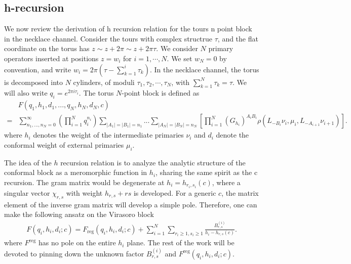\documentclass[12pt]{article}
\newcommand{\ie}{\begin{equation}\begin{aligned}}
\newcommand{\fe}{\end{aligned}\end{equation}}
\numberwithin{equation}{section}
\begin{document}
\subsection{h-recursion}

We now review the derivation of h recursion relation for the  tours n point block in the necklace channel.
Consider the tours with complex structrue $\tau$, and the flat coordinate on the torus has $z\sim z+2\pi\sim z+2\pi \tau$. We consider $N$ primary operators inserted at positions $z=w_i$ for $i=1,\cdots,N$. We set $w_N=0$ by convention, and write $w_i=2\pi(\tau-\sum_{k=1}^i\tau_k)$. In the necklace channel, the torus is decomposed into $N$ cylinders, of moduli $\tau_1, \tau_2, \cdots,\tau_N$, with $\sum_{k=1}^N\tau_k=\tau$. We will also write $q_i=e^{2\pi i\tau_i}$.  The torus $N$-point block is defined as
\ie\label{necklaceblock}
&F\left(q_1,h_1,d_1,...,q_N,h_N,d_N,c\right)
\\
=&\sum_{n_1,...,n_N=0}^{\infty}\left(\prod_{i=1}^{N}q_i^{n_i}\right)\sum_{|A_1|=|B_1|=n_1}...\sum_{|A_N|=|B_N|=n_N}\left[\prod_{i=1}^N\left(G_{h_i}\right)^{A_iB_i}\rho(L_{-B_i}\nu_i,\mu_i,L_{-A_{i+1}}\nu_{i+1})\right].
\fe
where $h_i$ denotes the weight of the intermediate primaries $\nu_i$ and $d_i$ denote the conformal weight of external primaries $\mu_i$.

The idea of the $h$ recursion relation is to analyze the analytic structure of the conformal block as a meromorphic function in $h_i$, sharing the same spirit as the c recursion. The gram matrix would be degenerate at $h_i=h_{r_i,s_i}(c)$, where a singular vector $\chi_{r,s}$ with weight $h_{r,s}+rs$ is developed. For a generic $c$, the matrix element of the inverse gram matrix will develop a simple pole. Therefore, one can make the following ansatz on the Virasoro block
\ie
F(q_i,h_i,d_i;c)= F_{\text{reg}}(q_i,h_i,d_i;c)+ \sum_{i=1}^N \sum_{r_i\geq 1, s_i\geq 1}\frac{B^{(i)}_{r,s}}{h_i- h_{r,s}(c)}.
\fe
where $F^{\text{reg}}$ has no pole on the entire $h_i$ plane. The rest of the work will be devoted to pinning down the unknown factor $B^{(i)}_{r,s}$ and $F^{\text{reg}}(q_i,h_i,d_i;c)$.
\end{document}

